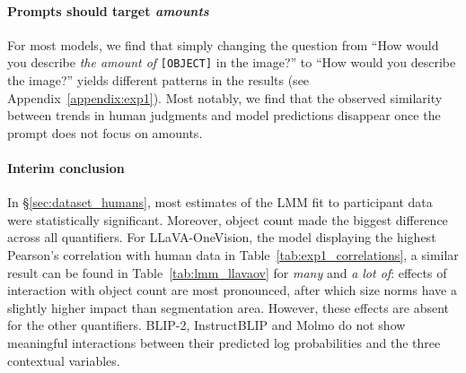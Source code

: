 \paragraph{Prompts should target \emph{amounts}} 
For most models, we find that simply changing the question from 
``How would you describe \emph{the amount of} \verb|[OBJECT]| in the image?'' 
to ``How would you describe the image?'' 
yields different patterns in the results (see Appendix~\ref{appendix:exp1}). 
Most notably, we find that the observed similarity between trends in human judgments and model predictions disappear once the prompt does not focus on amounts.

\paragraph{Interim conclusion}
In \S\ref{sec:dataset_humans}, most estimates of the LMM fit to participant data were statistically significant. 
Moreover, object count made the biggest difference across all quantifiers.
For LLaVA-OneVision, the model displaying the highest Pearson's correlation with human data in Table~\ref{tab:exp1_correlations}, a similar result can be found in  Table~\ref{tab:lmm_llavaov} for \textit{many} and \textit{a lot of}: effects of interaction with object count are most pronounced, after which size norms have a slightly higher impact than segmentation area. However, these effects are absent for the other quantifiers.
BLIP-2, InstructBLIP and Molmo do not show meaningful interactions between their predicted log probabilities and the three contextual variables.
